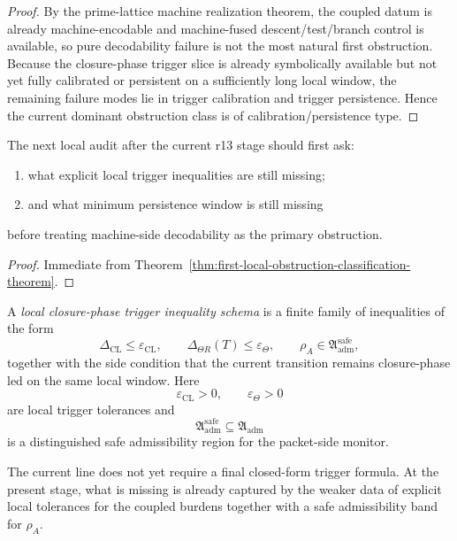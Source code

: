 \begin{proof}
By the prime-lattice machine realization theorem, the coupled datum is already machine-encodable and machine-fused descent/test/branch control is available, so pure decodability failure is not the most natural first obstruction.
Because the closure-phase trigger slice is already symbolically available but not yet fully calibrated or persistent on a sufficiently long local window, the remaining failure modes lie in trigger calibration and trigger persistence.
Hence the current dominant obstruction class is of calibration/persistence type.
\end{proof}

\begin{corollary}
\label{cor:next-post-v3320-local-audit-question}
The next local audit after the current r13 stage should first ask:
\begin{enumerate}
    \item what explicit local trigger inequalities are still missing;
    \item and what minimum persistence window is still missing
\end{enumerate}
before treating machine-side decodability as the primary obstruction.
\end{corollary}

\begin{proof}
Immediate from Theorem~\ref{thm:first-local-obstruction-classification-theorem}.
\end{proof}

\begin{definition}
\label{def:local-closure-phase-trigger-inequality-schema}
A \emph{local closure-phase trigger inequality schema} is a finite family of inequalities of the form
\[
\Delta_{\mathrm{CL}} \le \varepsilon_{\mathrm{CL}},
\qquad
\Delta_{\Theta R}(T) \le \varepsilon_{\Theta},
\qquad
\rho_A \in \mathfrak{A}_{\mathrm{adm}}^{\mathrm{safe}},
\]
together with the side condition that the current transition remains closure-phase led on the same local window.
Here
\[
\varepsilon_{\mathrm{CL}}>0,
\qquad
\varepsilon_{\Theta}>0
\]
are local trigger tolerances and
\[
\mathfrak{A}_{\mathrm{adm}}^{\mathrm{safe}}\subseteq \mathfrak{A}_{\mathrm{adm}}
\]
is a distinguished safe admissibility region for the packet-side monitor.
\end{definition}

\begin{remark}
\label{rem:meaning-of-the-inequality-schema}
The current line does not yet require a final closed-form trigger formula.
At the present stage, what is missing is already captured by the weaker data of explicit local tolerances for the coupled burdens together with a safe admissibility band for \(\rho_A\).
\end{remark}

